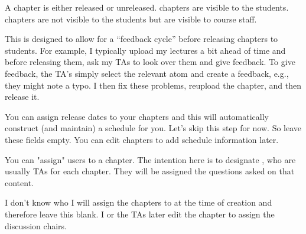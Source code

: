 \begin{gram}
A chapter is either released or unreleased. 
%
 chapters are visible to the students.
%
 chapters are not visible to the students but  are visible to course staff.  

This is designed to allow for a ``feedback cycle'' before releasing chapters to students.  
%
For example, I typically  upload my lectures a bit ahead of time and before releasing them, ask my TAs to look over them and give feedback.
%
To give feedback, the TA's simply select the relevant atom and create a feedback, e.g., they might note a typo.
%
I then fix these problems, reupload the chapter, and then release it.  
\end{gram}

\begin{gram}  
You can assign release dates to your chapters and this will
automatically construct (and maintain) a schedule for you.  Let's skip
this step for now.  So leave these fields empty.  You can edit
chapters to add schedule information later.
\end{gram}


\begin{gram}
You can "assign" users to a chapter.  The intention here is to
designate , who are usually TAs for each
chapter. 
%
They will be assigned the questions asked on that content.

I don't know who I will assign the chapters to at the time of creation and therefore leave this blank.  I or the TAs later edit the chapter to assign the discussion chairs. 
\end{gram}

